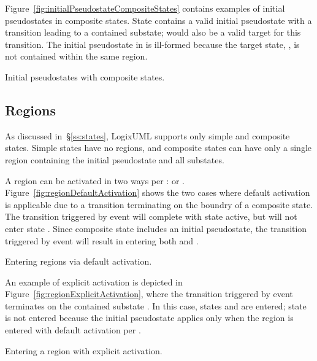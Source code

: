 Figure~\ref{fig:initialPseudostateCompositeStates} contains examples of
initial pseudostates in composite states. State 
contains a valid initial pseudostate with a transition leading to
a contained substate;  would also be a valid target
for this transition. The initial pseudostate in  is
ill-formed because the target state, , is not contained within
the same region.

               {Initial pseudostates with composite states.}


\subsection{Regions}

As discussed in~\S\ref{ss:states}, LogixUML supports only simple and
composite states. Simple states have no regions, and composite states
can have only a single region containing the initial pseudostate and
all substates.

A region can be activated in two ways per \textcite[\S14.2.3.2]{OMGUML}:
 or
.
Figure~\ref{fig:regionDefaultActivation} shows the two cases where
default activation is applicable due to a transition terminating
on the boundry of a composite state. The transition triggered by
event  will complete with state 
active, but will not enter state .
Since composite state  includes an initial
pseudostate, the transition triggered by event  will
result in entering both  and .

               {Entering regions via default activation.}

An example of explicit activation is depicted in
Figure~\ref{fig:regionExplicitActivation}, where the transition triggered
by event  terminates on the contained substate
. In this case, states  and
 are entered;
state  is not entered because the initial pseudostate
applies only when the region is entered with default activation per
\textcite[\S14.2.3.7]{OMGUML}.

               {Entering a region with explicit activation.}


